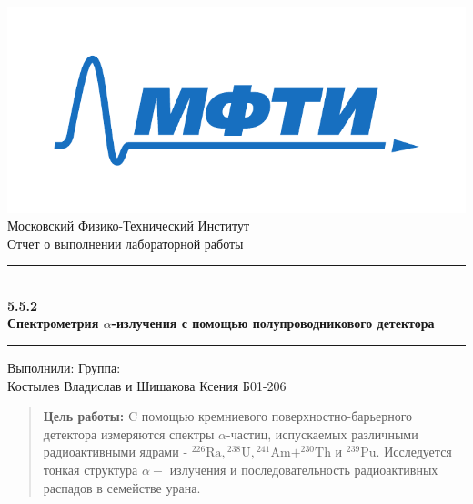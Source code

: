 \documentclass[a4paper, 12pt]{article}
\begin{document}

\begin{titlepage}
    \vspace*{\fill}
    
    \begin{center}
        \includegraphics[scale=0.8]{res/MIPT.pdf}
        \\[0.7cm]\Huge Московский Физико-Технический Институт
        \\[2cm]\LARGE Отчет о выполнении лабораторной работы 
        \\[0.5cm]\noindent\rule{\textwidth}{1pt}
        \\\Huge\textbf{5.5.2 \\ Спектрометрия $\alpha$-излучения с помощью полупроводникового детектора}
        \\[-0.5cm]\noindent\rule{\textwidth}{1pt}
    \end{center}
    
    \vspace*{\fill}
    
    \begin{flushleft}
        Выполнили: \hspace{\fill} Группа:
        \\Костылев Владислав и Шишакова Ксения\hspace{\fill} Б01-206
    \end{flushleft}
\end{titlepage}

\setcounter{page}{2}


\begin{abstract}
    \textbf{Цель работы:} C помощью кремниевого поверхностно-барьерного детектора измеряются спектры $\alpha$-частиц, испускаемых различными радиоактивными ядрами - ${ }^{226} \mathrm{Ra},{ }^{238} \mathrm{U},{ }^{241} \mathrm{Am} + ^{230} \mathrm{Th}$ и ${ }^{239} \mathrm{Pu}$. Исследуется тонкая структура $\alpha-$ излучения и последовательность радиоактивных распадов в семействе урана.
\end{abstract}
\end{document}
